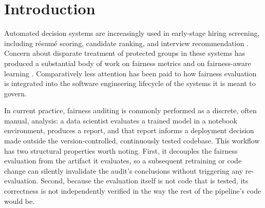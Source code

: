 \documentclass[]{einformatica}
\begin{document}
\begin{abstract}[en]
\textbf{Results}:
Four of seven mutants were caught. Detectability depends less on whether a fault occurs in the gate or its tests than on what the fault does: faults that corrupt inputs to a live check can remain observable, whereas faults that eliminate the check itself are invisible to the suite's own pass/fail signal. \\
\textbf{Conclusions}:
The more general and actionable finding is not the 57\% figure, which characterizes only this hand-selected fault set, but the underlying distinction: fairness classification and gate-enforcement logic are independently testable claims, and a fault that eliminates a check can be invisible to the suite's own pass/fail signal and requires an external check to catch.
\end{abstract}

\maketitle


\section{Introduction}\label{sec:Introduction}

Automated decision systems are increasingly used in early-stage hiring screening, including r\'esum\'e scoring, candidate ranking, and interview recommendation \cite{Raghavan2020}. Concern about disparate treatment of protected groups in these systems has produced a substantial body of work on fairness metrics \cite{Barocas2023} and on fairness-aware learning \cite{Mehrabi2021}. Comparatively less attention has been paid to how fairness evaluation is integrated into the software engineering lifecycle of the systems it is meant to govern.

In current practice, fairness auditing is commonly performed as a discrete, often manual, analysis: a data scientist evaluates a trained model in a notebook environment, produces a report, and that report informs a deployment decision made outside the version-controlled, continuously tested codebase. This workflow has two structural properties worth noting. First, it decouples the fairness evaluation from the artifact it evaluates, so a subsequent retraining or code change can silently invalidate the audit's conclusions without triggering any re-evaluation. Second, because the evaluation itself is not code that is tested, its correctness is not independently verified in the way the rest of the pipeline's code would be.
\end{document}
